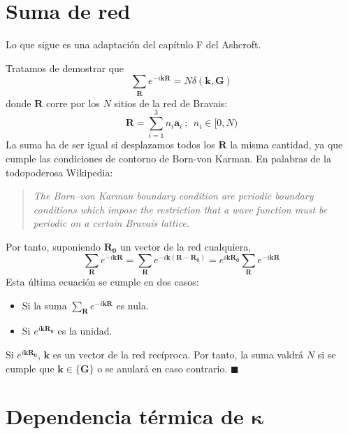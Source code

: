 \chapter{Suma de red}
\label{chap:latticesum}

Lo que sigue es una adaptación del capítulo F del Ashcroft.

Tratamos de demostrar que
\begin{equation*}
\sum_\mathbf{R} e^{-i\mathbf{k}\mathbf{R}}=N {\delta(\mathbf{k},\mathbf{G})}
\end{equation*}
donde $\mathbf{R}$ corre por los $N$ sitios de la red de Bravais:
\begin{equation*}
  \mathbf{R} = \sum_{i=1}^{3} n_i \mathbf{a}_i \ ; \ \ n_i \in [0,N)
\end{equation*}
La suma ha de ser igual si desplazamos todos los $\mathbf{R}$ la misma
cantidad, ya que cumple las condiciones de contorno de Born-von
Karman. En palabras de la todopoderosa Wikipedia:
\begin{quotation}
  \emph{The Born–von Karman boundary condition are periodic boundary
    conditions which impose the restriction that a wave function must be
    periodic on a certain Bravais lattice.}
\end{quotation}

Por tanto, suponiendo $\mathbf{R_0}$ un vector de la red cualquiera,
\begin{equation*}
 \sum_\mathbf{R} e^{-i\mathbf{k}\mathbf{R}} = \sum_\mathbf{R}
 e^{-i\mathbf{k}(\mathbf{R} - \mathbf{R_0})} =  e^{i \mathbf{k} \mathbf{R_0}}\sum_\mathbf{R} e^{-i\mathbf{k}\mathbf{R}}
\end{equation*}
Esta última ecuación se cumple en dos casos:
\begin{itemize}
\item Si la suma $ \sum_\mathbf{R} e^{-i\mathbf{k}\mathbf{R}}$ es nula.
\item Si $e^{i \mathbf{k} \mathbf{R_0}}$ es la unidad.
\end{itemize}

Si $e^{i \mathbf{k} \mathbf{R_0}}$, $\mathbf{k}$ es un vector de la
red recíproca. Por tanto, la suma valdrá $N$ si se cumple que
$\mathbf{k} \in \{ \mathbf{G} \}$ o se anulará en caso
contrario. $\blacksquare$

\chapter{Dependencia térmica de $\boldsymbol{\kappa}$}
\label{app:thermaldep}


